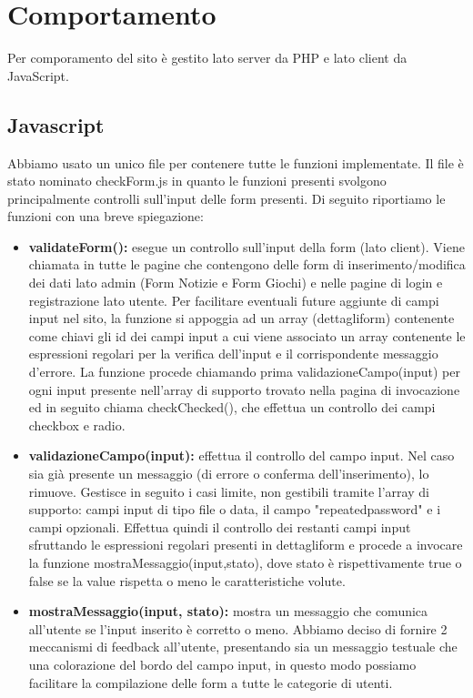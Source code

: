 \section{Comportamento}
Per comporamento del sito è gestito lato server da PHP e lato client da JavaScript.

\subsection{Javascript}
Abbiamo usato un unico file per contenere tutte le funzioni implementate. Il file è stato nominato checkForm.js in quanto le funzioni presenti svolgono principalmente controlli sull'input delle form presenti.
Di seguito riportiamo le funzioni con una breve spiegazione:

\begin{itemize}
	\item \textbf{validateForm(): } esegue un controllo sull'input della form (lato client). Viene chiamata in tutte le pagine che contengono delle form di inserimento/modifica dei dati lato admin (Form Notizie e Form Giochi) e nelle pagine di login e registrazione lato utente.
	Per facilitare eventuali future aggiunte di campi input nel sito, la funzione si appoggia ad un array (dettagliform) contenente come chiavi gli id dei campi input a cui viene associato un array contenente le espressioni regolari per la verifica dell'input e il corrispondente messaggio d'errore.
	La funzione procede chiamando prima validazioneCampo(input) per ogni input presente nell'array di supporto trovato nella pagina di invocazione ed in seguito chiama checkChecked(), che effettua un controllo dei campi checkbox e radio.\\
	\item \textbf{validazioneCampo(input): } effettua il controllo del campo input. Nel caso sia già presente un messaggio (di errore o conferma dell'inserimento), lo rimuove. Gestisce in seguito i casi limite, non gestibili tramite l'array di supporto: campi input di tipo file o data, il campo "repeatedpassword" e i campi opzionali. Effettua quindi il controllo dei restanti campi input sfruttando le espressioni regolari presenti in dettagliform e procede a invocare la funzione mostraMessaggio(input,stato), dove stato è rispettivamente true o false se la value rispetta o meno le caratteristiche volute. \\
	\item \textbf{mostraMessaggio(input, stato): } mostra un messaggio che comunica all'utente se l'input inserito è corretto o meno. Abbiamo deciso di fornire 2 meccanismi di feedback all'utente, presentando sia un messaggio testuale che una colorazione del bordo del campo input, in questo modo possiamo facilitare la compilazione delle form a tutte le categorie di utenti.\\

\end{itemize}
